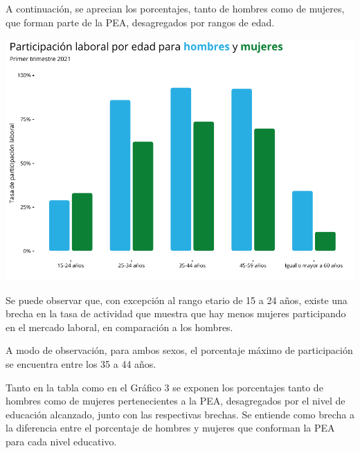\documentclass[
]{article}
\begin{document}
A continuación, se aprecian los porcentajes, tanto de hombres como de
mujeres, que forman parte de la PEA, desagregados por rangos de edad.

\includegraphics{Informe-Mercado-Laboral_files/figure-latex/unnamed-chunk-13-1.pdf}

Se puede observar que, con excepción al rango etario de 15 a 24 años,
existe una brecha en la tasa de actividad que muestra que hay menos
mujeres participando en el mercado laboral, en comparación a los
hombres.

A modo de observación, para ambos sexos, el porcentaje máximo de
participación se encuentra entre los 35 a 44 años.

Tanto en la tabla como en el Gráfico 3 se exponen los porcentajes tanto
de hombres como de mujeres pertenecientes a la PEA, desagregados por el
nivel de educación alcanzado, junto con las respectivas brechas. Se
entiende como brecha a la diferencia entre el porcentaje de hombres y
mujeres que conforman la PEA para cada nivel educativo.
\end{document}

